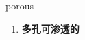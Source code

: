
\begin{frame}
{\huge porous}
\begin{center}
\begin{enumerate}\Large
  \item \textbf{多孔可渗透的}
\end{enumerate}
\end{center}
\end{frame}
